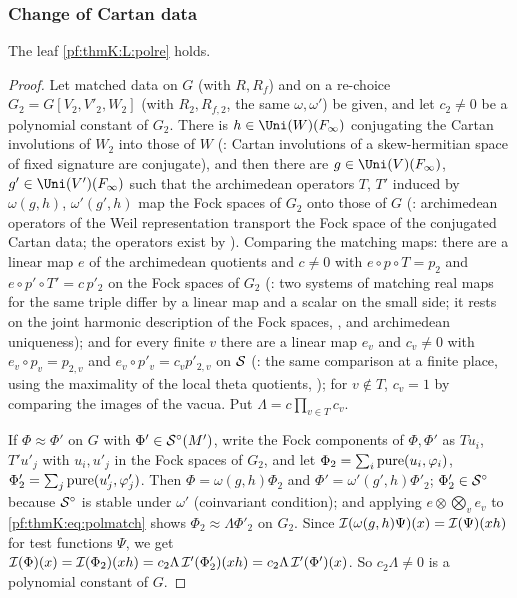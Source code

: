\subsubsection{Change of Cartan data}\label{sec:pf:thmK:polre}

\begin{proposition}\label{pf:thmK:polre}
The leaf \ref{pf:thmK:L:polre} holds.
\end{proposition}

\begin{proof}
Let matched data on $G$ (with $R,R_f$) and on a re-choice $G_2=G[V_2,V'_2,W_2]$ (with $R_2,R_{f,2}$, the same $\omega,\omega'$)
be given, and let $c_2\ne0$ be a polynomial constant of $G_2$. There is $h\in\Uni(W)(F_\infty)$ conjugating the Cartan
involutions of $W_2$ into those of $W$ (: Cartan involutions of a
skew-hermitian space of fixed signature are conjugate), and then there are $g\in\Uni(V)(F_\infty)$, $g'\in\Uni(V')(F_\infty)$
such that the archimedean operators $T$, $T'$ induced by $\omega(g,h)$, $\omega'(g',h)$ map the Fock spaces of $G_2$ onto
those of $G$ (: archimedean operators of the Weil representation transport the
Fock space of the conjugated Cartan data; the operators exist by ). Comparing the
matching maps: there are a linear map $e$ of the archimedean quotients and $c\ne0$ with $e\circ p\circ T=p_2$ and $e\circ
p'\circ T'=c\,p'_2$ on the Fock spaces of $G_2$ (: two systems
of matching real maps for the same triple differ by a linear map and a scalar on the small side; it rests on the joint
harmonic description of the Fock spaces, , and archimedean uniqueness); and
for every finite $v$ there are a linear map $e_v$ and $c_v\ne0$ with $e_v\circ p_v=p_{2,v}$ and $e_v\circ p'_v=c_vp'_{2,v}$ on
$\mathcal{S}$ (: the same comparison at a finite place, using the maximality
of the local theta quotients, ); for $v\notin T$, $c_v=1$ by comparing the images
of the vacua. Put $\Lambda=c\prod_{v\in T}c_v$.

If $\Phi\approx\Phi'$ on $G$ with $\Phi'\in\mathcal{S}^{\circ}(M')$, write the Fock components of $\Phi,\Phi'$ as $Tu_i$, $T'u'_j$ with
$u_i,u'_j$ in the Fock spaces of $G_2$, and let $\Phi_2=\sum_i\operatorname{pure}(u_i,\varphi_i)$, $\Phi'_2=\sum_j\operatorname{pure}(u'_j,
\varphi'_j)$. Then $\Phi=\omega(g,h)\Phi_2$ and $\Phi'=\omega'(g',h)\Phi'_2$; $\Phi'_2\in\mathcal{S}^{\circ}$ because $\mathcal{S}^{\circ}$ is stable
under $\omega'$ (coinvariant condition); and applying $e\otimes\bigotimes_ve_v$ to \eqref{pf:thmK:eq:polmatch} shows
$\Phi_2\approx\Lambda\Phi'_2$ on $G_2$. Since $\mathcal{I}(\omega(g,h)\Psi)(x)=\mathcal{I}(\Psi)(xh)$ for test functions $\Psi$, we get
$\mathcal{I}(\Phi)(x)=\mathcal{I}(\Phi_2)(xh)=c_2\Lambda\,\mathcal{I}'(\Phi'_2)(xh)=c_2\Lambda\,\mathcal{I}'(\Phi')(x)$. So $c_2\Lambda\ne0$ is a
polynomial constant of $G$.
\end{proof}


